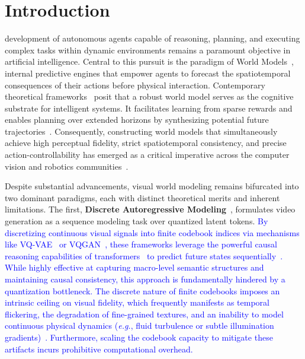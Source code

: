 \section{Introduction}
\label{sec1:Intro}

 development of autonomous agents capable of reasoning, planning, and executing complex tasks within dynamic environments remains a paramount objective in artificial intelligence. Central to this pursuit is the paradigm of World Models~\cite{ha2018world, hafner2019dream}, internal predictive engines that empower agents to forecast the spatiotemporal consequences of their actions before physical interaction. Contemporary theoretical frameworks~\cite{lecun2022path} posit that a robust world model serves as the cognitive substrate for intelligent systems. It facilitates learning from sparse rewards and enables planning over extended horizons by synthesizing potential future trajectories~\cite{hafner2020dreamerv2, hafner2023dreamerv3}. Consequently, constructing world models that simultaneously achieve high perceptual fidelity, strict spatiotemporal consistency, and precise action-controllability has emerged as a critical imperative across the computer vision and robotics communities~\cite{bruce2024genie, wu2024ivideogpt, wang2025sampo}.

Despite substantial advancements, visual world modeling remains bifurcated into two dominant paradigms, each with distinct theoretical merits and inherent limitations. The first, \textbf{Discrete Autoregressive Modeling}~\cite{van2017neural, esser2021taming}, formulates video generation as a sequence modeling task over quantized latent tokens. 
\textcolor{blue}{By discretizing continuous visual signals into finite codebook indices via mechanisms like VQ-VAE~\cite{van2017neural} or VQGAN~\cite{esser2021taming}, these frameworks leverage the powerful causal reasoning capabilities of transformers~\cite{vaswani2017attention, brown2020language} to predict future states sequentially~\cite{yan2021videogpt, rakhimov2020latent}. While highly effective at capturing macro-level semantic structures and maintaining causal consistency, this approach is fundamentally hindered by a quantization bottleneck. The discrete nature of finite codebooks imposes an intrinsic ceiling on visual fidelity, which frequently manifests as temporal flickering, the degradation of fine-grained textures, and an inability to model continuous physical dynamics (\textit{e.g.}, fluid turbulence or subtle illumination gradients)~\cite{yu2023magvit, yu2023language}. Furthermore, scaling the codebook capacity to mitigate these artifacts incurs prohibitive computational overhead.}

